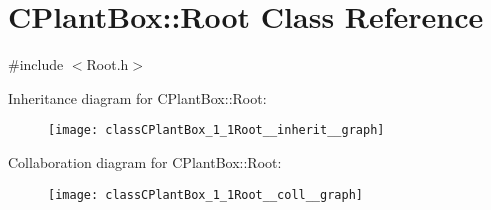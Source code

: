 \hypertarget{classCPlantBox_1_1Root}{}\section{C\+Plant\+Box\+:\+:Root Class Reference}
\label{classCPlantBox_1_1Root}


{\ttfamily \#include $<$Root.\+h$>$}



Inheritance diagram for C\+Plant\+Box\+:\+:Root\+:\nopagebreak
\begin{figure}[H]
\begin{center}
\leavevmode
\texttt{[image: classCPlantBox\_1\_1Root\_\_inherit\_\_graph]}
\end{center}
\end{figure}


Collaboration diagram for C\+Plant\+Box\+:\+:Root\+:\nopagebreak
\begin{figure}[H]
\begin{center}
\leavevmode
\texttt{[image: classCPlantBox\_1\_1Root\_\_coll\_\_graph]}
\end{center}
\end{figure}
